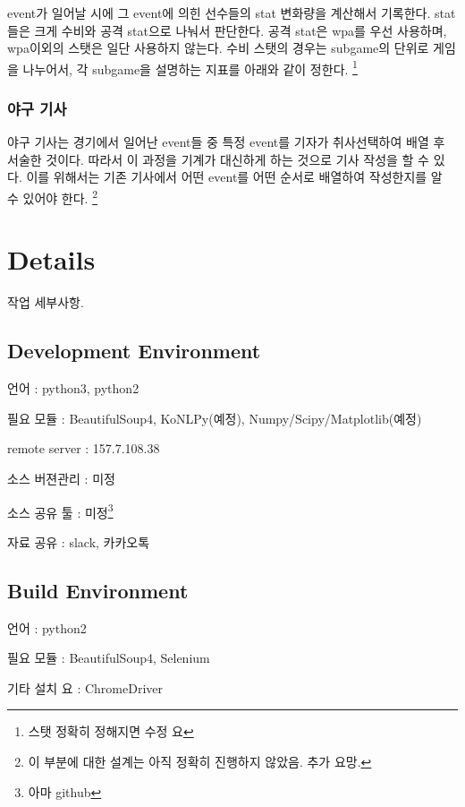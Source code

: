 \documentclass[twoside]{article}
\begin{document}
event가 일어날 시에 그 event에 의힌 선수들의 stat 변화량을 계산해서 기록한다. stat들은 크게 수비와 공격 stat으로 나눠서 판단한다. 
공격 stat은 wpa를 우선 사용하며, wpa이외의 스탯은 일단 사용하지 않는다. 
수비 스탯의 경우는 subgame의 단위로 게임을 나누어서, 각 subgame을 설명하는 지표를 아래와 같이 정한다. \footnote{스탯 정확히 정해지면 수정 요}


\subsubsection{야구 기사}

야구 기사는 경기에서 일어난 event들 중 특정 event를 기자가 취사선택하여 배열 후 서술한 것이다. 따라서 이 과정을 기계가 대신하게 하는 것으로 기사 작성을 할 수 있다. 이를 위해서는 기존 기사에서 어떤 event를 어떤 순서로 배열하여 작성한지를 알 수 있어야 한다. \footnote{이 부분에 대한 설계는 아직 정확히 진행하지 않았음. 추가 요망. } 


\section{Details}

작업 세부사항. 

\subsection{Development Environment}
 
\begin{compactitem}
\item 언어 : python3, python2
\item 필요 모듈 : BeautifulSoup4, KoNLPy(예정), Numpy/Scipy/Matplotlib(예정)
\item remote server : 157.7.108.38
\item 소스 버젼관리 : 미정
\item 소스 공유 툴 : 미정\footnote{아마 github}
\item 자료 공유 : slack, 카카오톡
\end{compactitem}

\subsection{Build Environment}

\begin{compactitem}
\item 언어 : python2
\item 필요 모듈 : BeautifulSoup4, Selenium 
\item 기타 설치 요 : ChromeDriver
\end{compactitem}
\end{document}
